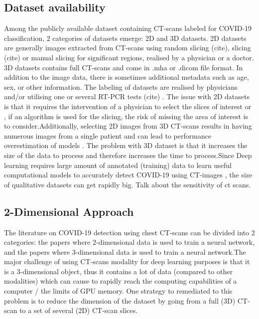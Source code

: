\documentclass[12pt, letterpaper]{article}
\begin{document}
\subsection{Dataset availability}
Among the publicly available dataset containing CT-scans labeled for COVID-19 classification, 2 categories of datasets emerge: 2D and 3D datasets. 2D datasets are generally images extracted from CT-scans using random slicing (cite), slicing (cite) or manual slicing for significant regions, realised by a physician or a doctor. 3D datasets contains full CT-scans and come in .mha or .dicom file format. In addition to the image data, there is sometimes additional metadata such as age, sex, or other information. The labeling of datasets are realised by physicians and/or utilising one or several RT-PCR tests (cite) . The issue with 2D datasets is that it requires the intervention of a physician to select the slices of interest or , if an algorithm is used for the slicing, the risk of missing the area of interest is to consider.Additionally, selecting 2D images from 3D CT-scans results in having numerous images from a single patient and can lead to performance overestimation of models \cite{Altaf_2021}. The problem with 3D dataset is that it increases the size of the data to process and therefore increases the time to process.Since Deep learning requires large amount of annotated (training) data to learn useful computational models to accurately detect COVID-19 using CT-images \cite{Altaf_2021}, the size of qualitative datasets can get rapidly big.
Talk about the sensitivity of ct scans.  



\subsection{2-Dimensional Approach}
The literature on COVID-19 detection using chest CT-scans can be divided into 2 categories: the papers where 2-dimensional data is used to train a neural network, and the papers where 3-dimensional data is used to train a neural network.The major challenge of using CT-scans modality for deep learning purposes is that it is a 3-dimensional object, thus it contains a lot of data (compared to other modalities) which can cause to rapidly reach the computing capabilities of a computer / the limits of GPU memory. One strategy to remediated to this problem is to reduce the dimension of the dataset by going from a full (3D) CT-scan to a set of several (2D) CT-scan slices.
\end{document}
